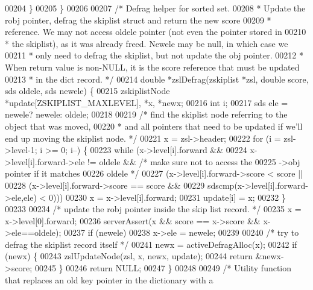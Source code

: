 \begin{DoxyCode}
00204     \}
00205 \}
00206 
00207 \textcolor{comment}{/* Defrag helper for sorted set.}
00208 \textcolor{comment}{ * Update the robj pointer, defrag the skiplist struct and return the new score}
00209 \textcolor{comment}{ * reference. We may not access oldele pointer (not even the pointer stored in}
00210 \textcolor{comment}{ * the skiplist), as it was already freed. Newele may be null, in which case we}
00211 \textcolor{comment}{ * only need to defrag the skiplist, but not update the obj pointer.}
00212 \textcolor{comment}{ * When return value is non-NULL, it is the score reference that must be updated}
00213 \textcolor{comment}{ * in the dict record. */}
00214 \textcolor{keywordtype}{double} *zslDefrag(zskiplist *zsl, \textcolor{keywordtype}{double} score, sds oldele, sds newele) \{
00215     zskiplistNode *update[ZSKIPLIST\_MAXLEVEL], *x, *newx;
00216     \textcolor{keywordtype}{int} i;
00217     sds ele = newele? newele: oldele;
00218 
00219     \textcolor{comment}{/* find the skiplist node referring to the object that was moved,}
00220 \textcolor{comment}{     * and all pointers that need to be updated if we'll end up moving the skiplist node. */}
00221     x = zsl->header;
00222     \textcolor{keywordflow}{for} (i = zsl->level-1; i >= 0; i--) \{
00223         \textcolor{keywordflow}{while} (x->level[i].forward &&
00224             x->level[i].forward->ele != oldele && \textcolor{comment}{/* make sure not to access the}
00225 \textcolor{comment}{                                                     ->obj pointer if it matches}
00226 \textcolor{comment}{                                                     oldele */}
00227             (x->level[i].forward->score < score ||
00228                 (x->level[i].forward->score == score &&
00229                 sdscmp(x->level[i].forward->ele,ele) < 0)))
00230             x = x->level[i].forward;
00231         update[i] = x;
00232     \}
00233 
00234     \textcolor{comment}{/* update the robj pointer inside the skip list record. */}
00235     x = x->level[0].forward;
00236     serverAssert(x && score == x->score && x->ele==oldele);
00237     \textcolor{keywordflow}{if} (newele)
00238         x->ele = newele;
00239 
00240     \textcolor{comment}{/* try to defrag the skiplist record itself */}
00241     newx = activeDefragAlloc(x);
00242     \textcolor{keywordflow}{if} (newx) \{
00243         zslUpdateNode(zsl, x, newx, update);
00244         \textcolor{keywordflow}{return} &newx->score;
00245     \}
00246     \textcolor{keywordflow}{return} NULL;
00247 \}
00248 
00249 \textcolor{comment}{/* Utility function that replaces an old key pointer in the dictionary with a}

\end{DoxyCode}
